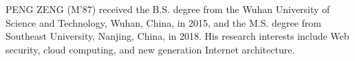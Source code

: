 \documentclass{ieeeaccess}
\begin{document}
\begin{IEEEbiography}{PENG ZENG} (M'87) received the B.S. degree from the
Wuhan University of Science and Technology,
Wuhan, China, in 2015, and the M.S. degree from
Southeast University, Nanjing, China, in 2018.
His research interests include Web security,
cloud computing, and new generation Internet
architecture.
\end{IEEEbiography}

\EOD
\end{document}
